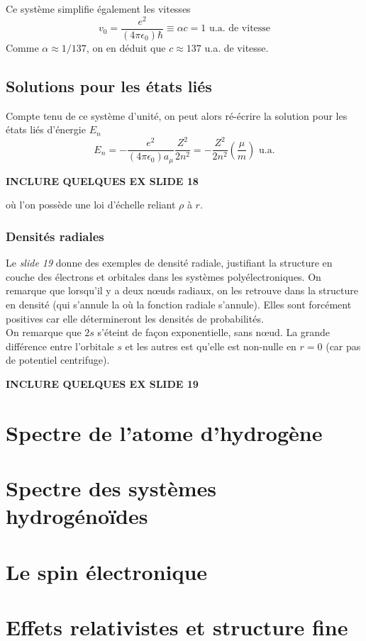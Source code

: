 Ce système simplifie également les vitesses
\begin{equation}
v_0 = \frac{e^2}{(4\pi\epsilon_0)\hbar}\equiv \alpha c = 1 \text{ u.a. de vitesse}
\end{equation}
Comme $\alpha \approx 1/137$, on en déduit que $c\approx 137$ u.a. de vitesse.\\


\subsection{Solutions pour les états liés}
Compte tenu de ce système d'unité, on peut alors ré-écrire la solution pour les états liés d'énergie $E_n$
\begin{equation}
E_n = -\frac{e^2}{(4\pi\epsilon_0)a_\mu}\frac{Z^2}{2n^2}=-\dfrac{Z^2}{2n^2}\left(\frac{\mu}{m}\right)\text{ u.a.}
\end{equation}
\begin{center}
\textbf{INCLURE QUELQUES EX SLIDE 18}
\end{center}
où l'on possède une loi d'échelle reliant $\rho$ à $r$.



\subsubsection{Densités radiales}
Le \textit{slide 19} donne des exemples de densité radiale, justifiant la structure en couche des 
électrons et orbitales dans les systèmes polyélectroniques. On remarque que lorsqu'il y a deux nœuds 
radiaux, on les retrouve dans la structure en densité (qui s'annule la où la fonction radiale s'annule). Elles
sont forcément positives car elle détermineront les densités de probabilités.\\

On remarque que $2s$ s'éteint de façon exponentielle, sans nœud. La grande différence entre l'orbitale $s$ et
les autres est qu'elle est non-nulle en $r=0$ (car pas de potentiel centrifuge).

\begin{center}
\textbf{INCLURE QUELQUES EX SLIDE 19}
\end{center}


\section{Spectre de l’atome d’hydrogène}


















\section{Spectre des systèmes hydrogénoïdes}
\section{Le spin électronique}
\section{Effets relativistes et structure fine}